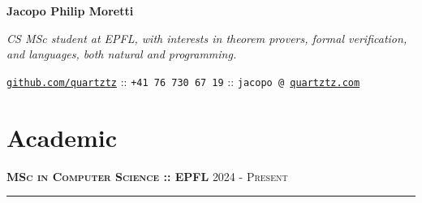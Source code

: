 \documentclass[11pt]{article}
\renewcommand{\url}[1]{{\texttt{#1}}}
\renewcommand{\line}[2]{{\vspace{12pt} \large \noindent\textbf{\textsc{#1}} \hfill \small{#2}}{\vspace{2pt}\hrule\vspace{4pt}}}
\begin{document}
  \setlength{\parindent}{0em}
  \pagestyle{empty}

  
  \noindent\begin{minipage}{0.64\textwidth}
    
    {\LARGE{\textbf{Jacopo Philip Moretti}}}

    \vspace{0.5em}
    \textit{CS MSc student at EPFL, with interests in theorem provers, formal verification, and languages, both natural and programming.}

    \vspace{0.5em}
    {
      \small
      \href{https://github.com/quartztz}{\url{github.com/quartztz}} :: \url{+41 76 730 67 19} :: \url{jacopo @ }\href{https://quartztz.com}{\url{quartztz.com}}
    }
  \end{minipage}

  \section*{Academic}
  \vspace{-1.5em}

  \line{MSc in Computer Science :: EPFL}{2024 - \textsc{Present}}
\end{document}
